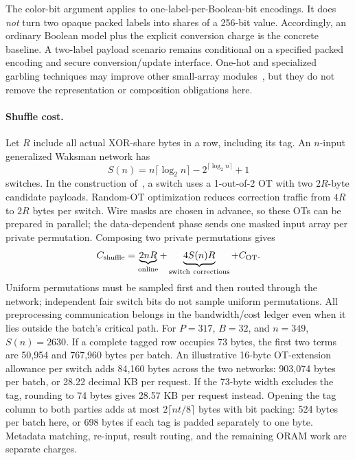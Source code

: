 The color-bit argument applies to one-label-per-Boolean-bit encodings.
It does \emph{not} turn two opaque packed labels into shares of a 256-bit
value.  Accordingly, an ordinary Boolean model plus the explicit conversion
charge is the concrete baseline.  A two-label payload scenario remains
conditional on a specified packed encoding and secure conversion/update
interface.  One-hot and specialized garbling techniques may improve other
small-array modules~\cite{heath2024,heath2021}, but they do not remove the
representation or composition obligations here.

\paragraph{Shuffle cost.}
Let $R$ include all actual XOR-share bytes in a row, including its tag.
An $n$-input generalized Waksman network has
\[
 S(n)=n\lceil\log_2 n\rceil-2^{\lceil\log_2 n\rceil}+1
\]
switches.  In the construction of~\cite[Appendix A.3.1 and Figure 16]{osn2021},
a switch uses a 1-out-of-2 OT with two $2R$-byte candidate payloads.
Random-OT optimization reduces correction traffic from $4R$ to $2R$
bytes per switch.  Wire masks are chosen in advance, so these OTs can be
prepared in parallel; the data-dependent phase sends one masked input
array per private permutation.  Composing two private permutations gives
\[
 C_{\rm shuffle}=\underbrace{2nR}_{\rm online}
             +\underbrace{4S(n)R}_{\rm switch\ corrections}
             +C_{\rm OT}.
\]
Uniform permutations must be sampled first and then routed through the
network; independent fair switch bits do not sample uniform permutations.
All preprocessing communication belongs in the bandwidth/cost ledger even
when it lies outside the batch's critical path.  For $P=317$, $B=32$, and
$n=349$, $S(n)=2630$.  If a complete tagged row occupies 73 bytes, the first
two terms are 50,954 and 767,960 bytes per batch.  An illustrative 16-byte
OT-extension allowance per switch adds 84,160 bytes across the two
networks: 903,074 bytes per batch, or 28.22 decimal KB per request.  If the
73-byte width excludes the tag, rounding to 74 bytes gives 28.57 KB per
request instead.  Opening the tag column to both parties adds at most
$2\lceil nt/8\rceil$ bytes with bit packing: 524 bytes per batch here,
or 698 bytes if each tag is padded separately to one byte.  Metadata
matching, re-input, result routing, and the remaining ORAM work are
separate charges.
